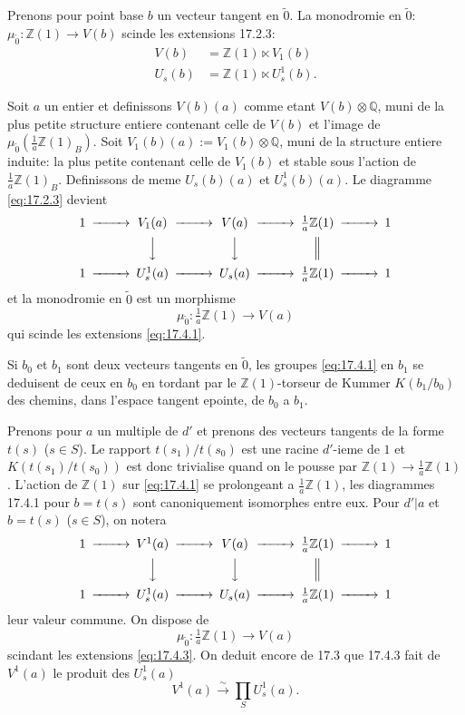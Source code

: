 \documentclass[12pt,a4paper]{article}
\theoremstyle{plain}
\theoremstyle{definition}
\theoremstyle{remark}
\newcommand{\Betti}{B}
\newcommand{\ZZ}{\mathbb{Z}}
\newcommand{\QQ}{\mathbb{Q}}
\begin{document}
Prenons pour point base $b$ un vecteur tangent en $\tilde{0}$. La
monodromie en $\tilde{0}$: $\mu_{\tilde{0}} : \ZZ(1) \to V(b)$ scinde
les extensions 17.2.3:
\begin{align*}
V(b) &= \ZZ(1) \ltimes V_1(b) \\
U_s(b) &= \ZZ(1) \ltimes U_s^1(b).
\end{align*}

Soit $a$ un entier et definissons $V(b)(a)$ comme etant
$V(b) \otimes \QQ$, muni de la plus petite structure entiere contenant
celle de $V(b)$ et l'image de
$\mu_{\tilde{0}}(\frac{1}{a}\ZZ(1)_\Betti)$. Soit
$V_1(b)(a) := V_1(b) \otimes \QQ$, muni de la structure entiere
induite: la plus petite contenant celle de $V_1(b)$ et stable sous
l'action de $\frac{1}{a}\ZZ(1)_\Betti$. Definissons de meme $U_s(b)(a)$
et $U_s^1(b)(a)$. Le diagramme \eqref{eq:17.2.3} devient
\begin{equation}\label{eq:17.4.1}
\begin{CD}
1 @>>> V_1(a) @>>> V(a) @>>> \frac{1}{a}\ZZ(1) @>>> 1 \\
@. @VVV @VVV @| \\
1 @>>> U_s^1(a) @>>> U_s(a) @>>> \frac{1}{a}\ZZ(1) @>>> 1
\end{CD}
\end{equation}
et la monodromie en $\tilde{0}$ est un morphisme
\begin{equation}\label{eq:17.4.2}
\mu_{\tilde{0}} : \tfrac{1}{a}\ZZ(1) \to V(a)
\end{equation}
qui scinde les extensions \eqref{eq:17.4.1}.

Si $b_0$ et $b_1$ sont deux vecteurs tangents en $\tilde{0}$, les
groupes \eqref{eq:17.4.1} en $b_1$ se deduisent de ceux en $b_0$ en
tordant par le $\ZZ(1)$-torseur de Kummer $K(b_1/b_0)$ des chemins,
dans l'espace tangent epointe, de $b_0$ a $b_1$.

Prenons pour $a$ un multiple de $d'$ et prenons des vecteurs tangents
de la forme $t(s)$ ($s \in S$). Le rapport $t(s_1)/t(s_0)$ est une
racine $d'$-ieme de $1$ et $K(t(s_1)/t(s_0))$ est donc trivialise
quand on le pousse par $\ZZ(1) \to \frac{1}{a}\ZZ(1)$. L'action de
$\ZZ(1)$ sur \eqref{eq:17.4.1} se prolongeant a
$\frac{1}{a}\ZZ(1)$, les diagrammes 17.4.1 pour $b = t(s)$ sont
canoniquement isomorphes entre eux. Pour $d' | a$ et $b = t(s)$
($s \in S$), on notera
\begin{equation}\label{eq:17.4.3}
\begin{CD}
1 @>>> V^1(a) @>>> V(a) @>>> \frac{1}{a}\ZZ(1) @>>> 1 \\
@. @VVV @VVV @| \\
1 @>>> U_s^1(a) @>>> U_s(a) @>>> \frac{1}{a}\ZZ(1) @>>> 1
\end{CD}
\end{equation}
leur valeur commune. On dispose de
\begin{equation}\label{eq:17.4.4}
\mu_{\tilde{0}} : \tfrac{1}{a}\ZZ(1) \to V(a)
\end{equation}
scindant les extensions \eqref{eq:17.4.3}. On deduit encore de 17.3
que 17.4.3 fait de $V^1(a)$ le produit des $U_s^1(a)$
\begin{equation}\label{eq:17.4.5}
V^1(a) \xrightarrow{\sim} \prod_S U_s^1(a).
\end{equation}
\end{document}
